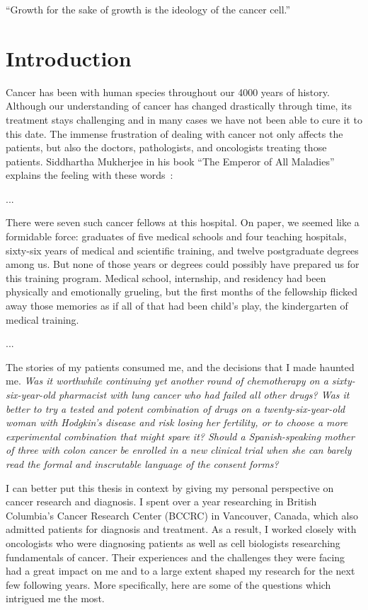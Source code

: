
\begin{savequote}[.5\linewidth]
  ``Growth for the sake of growth is the ideology of the cancer cell.''
\end{savequote}
\chapter{Introduction}
\label{ch:intro}
Cancer has been with human species throughout our 4000 years of history.
Although our understanding of cancer has changed drastically through time, its
treatment stays challenging and in many cases we have not been able to cure it
to this date. The immense frustration of dealing with cancer not only affects
the patients, but also the doctors, pathologists, and oncologists treating those
patients. Siddhartha Mukherjee in his book ``The Emperor of All Maladies''
explains the feeling with these
words~\cite[prologue]{the-emperor-of-all-maladies}:

\begin{displayquote}
  ...
  
  There were seven such cancer fellows at this hospital. On paper, we seemed
  like a formidable force: graduates of five medical schools and four teaching
  hospitals, sixty-six years of medical and scientific training, and twelve
  postgraduate degrees among us. But none of those years or degrees could
  possibly have prepared us for this training program. Medical school,
  internship, and residency had been physically and emotionally grueling, but
  the first months of the fellowship flicked away those memories as if all of
  that had been child's play, the kindergarten of medical training.

  ...

  The stories of my patients consumed me, and the decisions that I made haunted
  me. \emph{Was it worthwhile continuing yet another round of chemotherapy on a
    sixty-six-year-old pharmacist with lung cancer who had failed all other
    drugs? Was it better to try a tested and potent combination of drugs on a
    twenty-six-year-old woman with Hodgkin's disease and risk losing her
    fertility, or to choose a more experimental combination that might spare it?
    Should a Spanish-speaking mother of three with colon cancer be enrolled in a
    new clinical trial when she can barely read the formal and inscrutable
    language of the consent forms?}
\end{displayquote}

I can better put this thesis in context by giving my personal perspective on
cancer research and diagnosis. I spent over a year researching in British
Columbia's Cancer Research Center (BCCRC) in Vancouver, Canada, which also
admitted patients for diagnosis and treatment. As a result, I worked closely
with oncologists who were diagnosing patients as well as cell biologists
researching fundamentals of cancer. Their experiences and the challenges they
were facing had a great impact on me and to a large extent shaped my research
for the next few following years. More specifically, here are some of the
questions which intrigued me the most.

